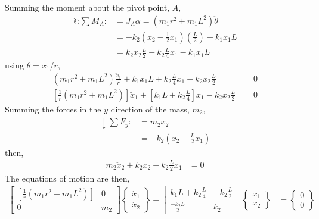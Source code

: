 Summing the moment about the pivot point, $A$, 
\begin{align*}
    \circlearrowright \sum M_A :&= J_A \alpha = (m_1 r^2 + m_1 L^2) \ddot{\theta} \\
    &= + k_2 \left(x_2 - \frac{1}{2} x_1 \right) \left(\frac{L}{2}\right) - k_1 x_1 L \\
    &= k_2 x_2 \frac{L}{2} - k_2 \frac{L}{4} x_1 - k_1 x_1 L
\end{align*}
using $\theta = x_1/r$, 
\begin{align*}
    (m_1 r^2 + m_1 L^2) \frac{\ddot{x}_1}{r} + k_1 x_1 L + k_2 \frac{L}{4} x_1 - k_2 x_2 \frac{L}{2} &= 0 \\
    \left[\frac{1}{r} \left(m_1 r^2 + m_1 L^2\right)\right] \ddot{x}_1 + \left[k_1 L + k_2 \frac{L}{4}\right] x_1 - k_2 x_2 \frac{L}{2} &= 0
\end{align*}
Summing the forces in the $y$ direction of the mass, $m_2$,
\begin{align*}
    \downarrow \sum F_y :&= m_2 \ddot{x}_2 \\
    &= - k_2 (x_2 - \frac{L}{2}x_1)
\end{align*}
then,
\begin{align*}
    m_2 \ddot{x}_2 + k_2 x_2 - k_2 \frac{L}{2} x_1 &= 0
\end{align*}
The equations of motion are then,
\begin{align*}
    \begin{bmatrix}
        \left[\frac{1}{r} \left(m_1 r^2 + m_1 L^2\right)\right] & 0 \\
        0 & m_2
    \end{bmatrix}
    \begin{Bmatrix}
        \ddot{x}_1 \\
        \ddot{x}_2
    \end{Bmatrix}
    +
    \begin{bmatrix}
        k_1 L + k_2 \frac{L}{4} & -k_2 \frac{L}{2} \\
        \frac{-k_2 L}{2} & k_2
    \end{bmatrix}
    \begin{Bmatrix}
        x_1 \\
        x_2
    \end{Bmatrix}
    &=
    \begin{Bmatrix}
        0 \\
        0
    \end{Bmatrix}
\end{align*}

